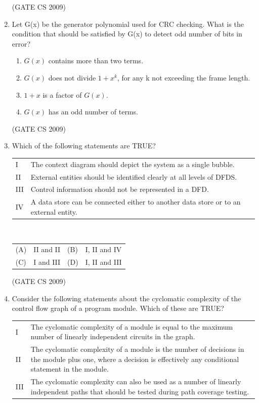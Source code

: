 \documentclass[a4paper, 11pt]{article}
\begin{document}
\begin{enumerate}
    \hfill (GATE CS 2009)

    \item  Let G(x) be the generator polynomial used for CRC checking. What is the condition that should be satisfied by G(x) to detect odd number of bits in error?\\
    \begin{enumerate}[label=(\Alph*)]
        \item $G(x)$ contains more than two terms.
        \item $G(x)$ does not divide $1+x^k$, for any k not exceeding the frame length.
        \item $1+x$ is a factor of $G(x)$.
        \item $G(x)$ has an odd number of terms.
    \end{enumerate}
    
    \hfill (GATE CS 2009)

    \item Which of the following statements are TRUE?\\
    \begin{tabular}{ll}
        I & The context diagram should depict the system as a single bubble. \\
        II & External entities should be identified clearly at all levels of DFDS.\\
        III & Control information should not be represented in a DFD.\\
        IV & A data store can be connected either to another data store or to an external entity.\\
    \end{tabular}\\
    
    \begin{tabularx}{\textwidth}{@{}lX lX@{}}
    (A) &  II and II  &  (B) &  I, II and IV \\
    (C) &  I and III & (D)  &  I, II and III\\
    \end{tabularx}  
    
    \hfill (GATE CS 2009)

    \item Consider the following statements about the cyclomatic complexity of the control flow graph of a program module. Which of these are TRUE?\\
    \begin{tabular}{ll}
        I & The cyclomatic complexity of a module is equal to the maximum number of linearly independent circuits in the graph. \\
        II & The cyclomatic complexity of a module is the number of decisions in the module plus one, where a decision is effectively any conditional statement in the module.\\
        III & The cyclomatic complexity can also be used as a number of linearly independent paths that should be tested during path coverage testing.\\
    \end{tabular}\\
    

\end{enumerate}
\end{document}
